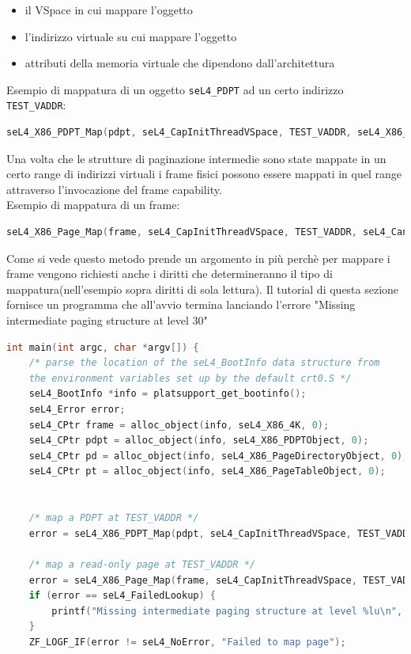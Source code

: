 \begin{itemize}
	\item il VSpace in cui mappare l'oggetto
	\item l'indirizzo virtuale su cui mappare l'oggetto
	\item attributi della memoria virtuale che dipendono dall'architettura 
\end{itemize}
Esempio di mappatura di un oggetto \texttt{seL4\_PDPT} ad un certo indirizzo \texttt{TEST\_VADDR}:
\begin{lstlisting}[language=C++]
seL4_X86_PDPT_Map(pdpt, seL4_CapInitThreadVSpace, TEST_VADDR, seL4_X86_Default_VMAttributes);
\end{lstlisting}
Una volta che le strutture di paginazione intermedie sono state mappate in un certo range di indirizzi virtuali i frame fisici possono essere mappati in quel range attraverso l'invocazione del frame capability.\\
Esempio di mappatura di un frame:
\begin{lstlisting}[language=C++]
seL4_X86_Page_Map(frame, seL4_CapInitThreadVSpace, TEST_VADDR, seL4_CanRead, seL4_X86_Default_VMAttributes);
\end{lstlisting}
Come si vede questo metodo prende un argomento in più perchè per mappare i frame vengono richiesti anche i diritti che determineranno il tipo di mappatura(nell'esempio sopra diritti di sola lettura).
Il tutorial di questa sezione fornisce un programma che all'avvio termina lanciando l'errore "Missing intermediate paging structure at level 30" 
\begin{lstlisting}[language=C++]
int main(int argc, char *argv[]) {
    /* parse the location of the seL4_BootInfo data structure from
    the environment variables set up by the default crt0.S */
    seL4_BootInfo *info = platsupport_get_bootinfo();
    seL4_Error error;
    seL4_CPtr frame = alloc_object(info, seL4_X86_4K, 0);
    seL4_CPtr pdpt = alloc_object(info, seL4_X86_PDPTObject, 0);
    seL4_CPtr pd = alloc_object(info, seL4_X86_PageDirectoryObject, 0);
    seL4_CPtr pt = alloc_object(info, seL4_X86_PageTableObject, 0);


    /* map a PDPT at TEST_VADDR */
    error = seL4_X86_PDPT_Map(pdpt, seL4_CapInitThreadVSpace, TEST_VADDR, seL4_X86_Default_VMAttributes);

    /* map a read-only page at TEST_VADDR */
    error = seL4_X86_Page_Map(frame, seL4_CapInitThreadVSpace, TEST_VADDR, seL4_CanRead, seL4_X86_Default_VMAttributes);
    if (error == seL4_FailedLookup) {
        printf("Missing intermediate paging structure at level %lu\n", seL4_MappingFailedLookupLevel());
    }
    ZF_LOGF_IF(error != seL4_NoError, "Failed to map page");
\end{lstlisting}
